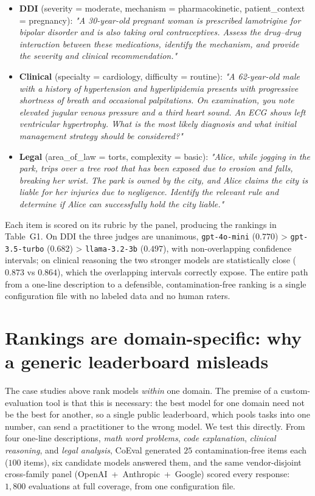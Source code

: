 \documentclass[11pt,a4paper]{article}
\begin{document}
\begin{itemize}
\tightlist
\item
  \textbf{DDI} (severity = moderate, mechanism = pharmacokinetic, patient\_context = pregnancy):
  \emph{"A 30-year-old pregnant woman is prescribed lamotrigine for bipolar disorder and is also taking oral
  contraceptives. Assess the drug--drug interaction between these medications, identify the mechanism, and provide
  the severity and clinical recommendation."}
\item
  \textbf{Clinical} (specialty = cardiology, difficulty = routine):
  \emph{"A 62-year-old male with a history of hypertension and hyperlipidemia presents with progressive shortness of
  breath and occasional palpitations. On examination, you note elevated jugular venous pressure and a third heart
  sound. An ECG shows left ventricular hypertrophy. What is the most likely diagnosis and what initial management
  strategy should be considered?"}
\item
  \textbf{Legal} (area\_of\_law = torts, complexity = basic):
  \emph{"Alice, while jogging in the park, trips over a tree root that has been exposed due to erosion and falls,
  breaking her wrist. The park is owned by the city, and Alice claims the city is liable for her injuries due to
  negligence. Identify the relevant rule and determine if Alice can successfully hold the city liable."}
\end{itemize}

Each item is scored on its rubric by the panel, producing the rankings in Table~G1. On DDI the three judges are
unanimous, \texttt{gpt-4o-mini} (\(0.770\)) \textgreater{} \texttt{gpt-3.5-turbo} (\(0.682\)) \textgreater{}
\texttt{llama-3.2-3b} (\(0.497\)), with non-overlapping confidence intervals; on clinical reasoning the two stronger
models are statistically close (\(0.873\) vs \(0.864\)), which the overlapping intervals correctly expose. The entire path
from a one-line description to a defensible, contamination-free ranking is a single configuration file with no labeled
data and no human raters.

\section{Rankings are domain-specific: why a generic leaderboard misleads}\label{appD}

The case studies above rank models \emph{within} one domain. The premise of a custom-evaluation tool is that this
is necessary: the best model for one domain need not be the best for another, so a single public leaderboard, which
pools tasks into one number, can send a practitioner to the wrong model. We test this directly. From four one-line
descriptions, \emph{math word problems}, \emph{code explanation}, \emph{clinical reasoning}, and \emph{legal
analysis}, CoEval generated \(25\) contamination-free items each (\(100\) items), six candidate models answered them,
and the same vendor-disjoint cross-family panel (OpenAI~+~Anthropic~+~Google) scored every
response: \(1{,}800\) evaluations at full coverage, from one configuration file.
\end{document}
